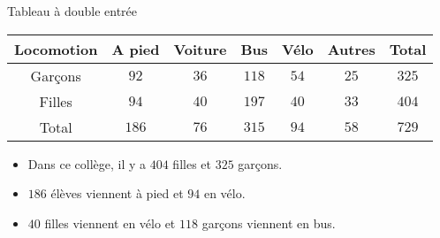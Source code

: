 \begin{pageCours}
\begin{ExT}{Tableau à double entrée}
 \begin{center}
 \begin{tabular}{|c|c|c|c|c|c|c|} \hline
  Locomotion & A pied & Voiture & Bus &  Vélo & Autres & Total \\  \hline
  Garçons & $92$ & $36$ & \textcolor{sacado_orange}{$118$}& $54$ & $25$ & \textcolor{sacado_blue}{$325$} \\\hline
  Filles &  $94$ & $40$ & $197$ & \textcolor{sacado_violet}{$40$}  & $33$ & \textcolor{sacado_green}{$404$} \\\hline
  Total & \textcolor{sacado_gray}{$186$} & $76$ & $315$& \textcolor{sacado_red}{$94$} & $58$ & $729$ \\ \hline
 \end{tabular}
 \end{center}
 
\begin{itemize} 
 \item Dans ce collège, il y a \textcolor{sacado_green}{$404$} filles et \textcolor{sacado_blue}{$325$} garçons.
 \item \textcolor{sacado_gray}{$186$} élèves viennent à pied et \textcolor{sacado_red}{$94$} en vélo.
 \item \textcolor{sacado_violet}{$40$} filles viennent en vélo et \textcolor{sacado_orange}{$118$} garçons viennent en bus.
\end{itemize}

\end{ExT}

\end{pageCours}





